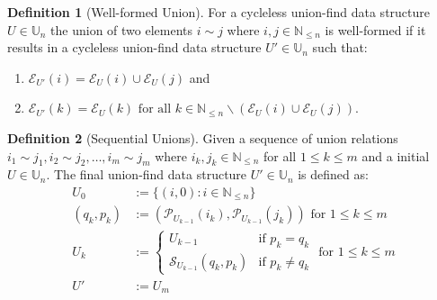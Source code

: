 \documentclass[a4paper,12pt]{article}
\theoremstyle{definition}
\newtheorem{definition}{Definition}[section]
\begin{document}
\begin{definition}[Well-formed Union]
    For a cycleless union-find data structure $U \in \mathbb{U}_n$ the union of
    two elements $i \sim j$ where $i, j \in \mathbb{N}_{\leq n}$ is well-formed
    if it results in a cycleless union-find data structure $U' \in \mathbb{U}_n$
    such that:
    \begin{enumerate}
        \item $\mathcal{E}_{U'}(i) = \mathcal{E}_U(i) \cup \mathcal{E}_U(j)$ and
        \item $\mathcal{E}_{U'}(k) = \mathcal{E}_U(k) \text{ for all } k \in
        \mathbb{N}_{\leq n} \backslash (\mathcal{E}_U(i) \cup \mathcal{E}_U(j))$.
    \end{enumerate}
\end{definition}

\begin{definition}[Sequential Unions]\label{def:sequential-unions}
    Given a sequence of union relations $i_1 \sim j_1, i_2 \sim j_2, \ldots, i_m
    \sim j_m$ where $i_k, j_k \in \mathbb{N}_{\leq n}$ for all $1 \leq k \leq m$
    and a initial  $U \in \mathbb{U}_n$. The final union-find data structure $U'
    \in \mathbb{U}_n$ is
    defined as:
    \begin{align*}
        U_0 &:= \{(i, 0) : i \in \mathbb{N}_{\leq n}\} \\
        (q_k, p_k) &:= (\mathcal{P}_{U_{k-1}}(i_k), \mathcal{P}_{U_{k-1}}(j_k)) \text{ for } 1 \leq k \leq m \\
        U_k &:= \begin{cases}
            U_{k-1} & \text{if } p_k = q_k \\
            \mathcal{S}_{U_{k-1}}(q_k, p_k) & \text{if } p_k \neq q_k
        \end{cases} \text{ for } 1 \leq k \leq m \\
        U' &:= U_m
    \end{align*}
\end{definition}
\end{document}
